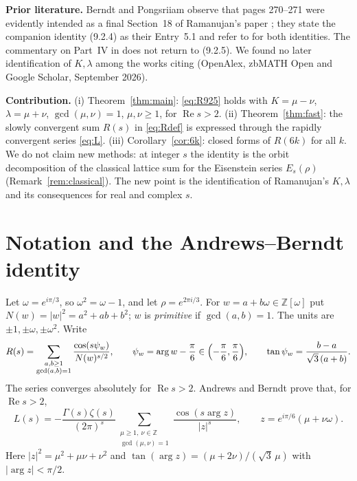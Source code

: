 \documentclass[11pt]{article}
\theoremstyle{remark}
\begin{document}
\medskip\noindent\textbf{Prior literature.} Berndt and Pongsriiam \cite{BP} observe that pages 270--271 were evidently intended as
a final Section~18 of Ramanujan's paper \cite{R18}; they state the companion identity (9.2.4) as their Entry~5.1 and refer to
\cite{AB4} for both identities. The commentary on Part~IV in \cite[\S18.4]{AB5} does not return to (9.2.5). We found no later
identification of $K,\lambda$ among the works citing \cite{AB4} (OpenAlex, zbMATH Open and Google Scholar, September 2026).

\medskip\noindent\textbf{Contribution.} (i) Theorem~\ref{thm:main}: \eqref{eq:R925} holds with $K=\mu-\nu$, $\lambda=\mu+\nu$,
$\gcd(\mu,\nu)=1$, $\mu,\nu\ge1$, for $\operatorname{Re}s>2$. (ii) Theorem~\ref{thm:fast}: the slowly convergent sum $R(s)$ in
\eqref{eq:Rdef} is expressed through the rapidly convergent series \eqref{eq:L}. (iii) Corollary~\ref{cor:6k}: closed forms of $R(6k)$
for all $k$. We do not claim new methods: at integer $s$ the identity is the orbit decomposition of the classical lattice sum for the
Eisenstein series $E_s(\rho)$ (Remark~\ref{rem:classical}). The new point is the identification of Ramanujan's $K,\lambda$ and
its consequences for real and complex $s$.

\section{Notation and the Andrews--Berndt identity}\label{sec:AB}
Let $\omega=e^{i\pi/3}$, so $\omega^2=\omega-1$, and let $\rho=e^{2\pi i/3}$. For $w=a+b\omega\in\mathbb Z[\omega]$ put
$N(w)=|w|^2=a^2+ab+b^2$; $w$ is \emph{primitive} if $\gcd(a,b)=1$. The units are $\pm1,\pm\omega,\pm\omega^2$. Write
\begin{equation}\label{eq:Rdef}
R(s)=\sum_{\substack{a,b\ge1\\ \gcd(a,b)=1}}\frac{\cos(s\psi_w)}{N(w)^{s/2}},\qquad
\psi_w=\arg w-\frac{\pi}{6}\in\Bigl(-\frac{\pi}{6},\frac{\pi}{6}\Bigr),\qquad \tan\psi_w=\frac{b-a}{\sqrt3\,(a+b)}.
\end{equation}
The series converges absolutely for $\operatorname{Re}s>2$. Andrews and Berndt \cite[p.~217]{AB4} prove that, for $\operatorname{Re}s>2$,
\begin{equation}\label{eq:AB}
L(s)=-\frac{\Gamma(s)\zeta(s)}{(2\pi)^s}\sum_{\substack{\mu\ge1,\ \nu\in\mathbb Z\\ \gcd(\mu,\nu)=1}}
\frac{\cos(s\arg z)}{|z|^{s}},\qquad z=e^{i\pi/6}(\mu+\nu\omega).
\end{equation}
Here $|z|^2=\mu^2+\mu\nu+\nu^2$ and $\tan(\arg z)=(\mu+2\nu)/(\sqrt3\,\mu)$ with $|\arg z|<\pi/2$.
\end{document}
